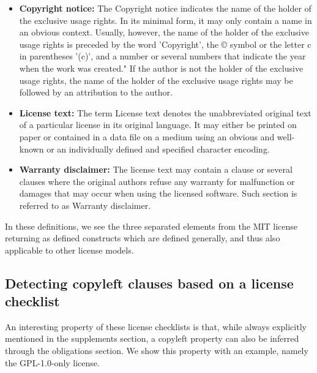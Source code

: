 \begin{itemize}
	\item \textbf{Copyright notice:} The Copyright notice indicates the name of the holder of the exclusive usage rights. In its minimal form, it may only contain a name in an obvious context. Usually, however, the name of the holder of the exclusive usage rights is preceded by the word 'Copyright', the © symbol or the letter c in parentheses '(c)', and a number or several numbers that indicate the year when the work was created." If the author is not the holder of the exclusive usage rights, the name of the holder of the exclusive usage rights may be followed by an attribution to the author.
	\item \textbf{License text:} The term License text denotes the unabbreviated original text of a particular license in its original language. It may either be printed on paper or contained in a data file on a medium using an obvious and well-known or an individually defined and specified character encoding.
	\item \textbf{Warranty disclaimer:} The license text may contain a clause or several clauses where the original authors refuse any warranty for malfunction or damages that may occur when using the licensed software. Such section is referred to as Warranty disclaimer.
\end{itemize}

In these definitions, we see the three separated elements from the MIT license returning as defined constructs which are defined generally, and thus also applicable to other license models.

\subsection{Detecting copyleft clauses based on a license checklist}\label{sec:detect-copyleft-from-license-checklist}

An interesting property of these license checklists is that, while always explicitly mentioned in the supplements section, a copyleft property can also be inferred through the obligations section. We show this property with an example, namely the GPL-1.0-only license.


